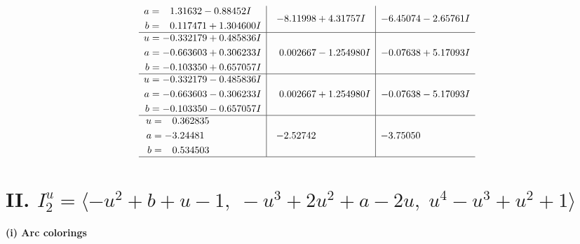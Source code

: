 \documentclass[1p]{elsarticle_modified}
\theoremstyle{definition}
\begin{document}
$$\begin{array}{c|c|c}
\begin{aligned}
a &= \phantom{-}1.31632 - 0.88452 I \\
b &= \phantom{-}0.117471 + 1.304600 I\end{aligned}
 & -8.11998 + 4.31757 I & -6.45074 - 2.65761 I \\ \hline\begin{aligned}
u &= -0.332179 + 0.485836 I \\
a &= -0.663603 + 0.306233 I \\
b &= -0.103350 + 0.657057 I\end{aligned}
 & \phantom{-}0.002667 - 1.254980 I & -0.07638 + 5.17093 I \\ \hline\begin{aligned}
u &= -0.332179 - 0.485836 I \\
a &= -0.663603 - 0.306233 I \\
b &= -0.103350 - 0.657057 I\end{aligned}
 & \phantom{-}0.002667 + 1.254980 I & -0.07638 - 5.17093 I \\ \hline\begin{aligned}
u &= \phantom{-}0.362835\phantom{ +0.000000I} \\
a &= -3.24481\phantom{ +0.000000I} \\
b &= \phantom{-}0.534503\phantom{ +0.000000I}\end{aligned}
 & -2.52742\phantom{ +0.000000I} & -3.75050\phantom{ +0.000000I}\\
 \hline 
 \end{array}$$\newpage\newpage\renewcommand{\arraystretch}{1}
\centering \section*{II. $I^u_{2}= \langle - u^2+b+u-1,\;- u^3+2 u^2+a-2 u,\;u^4- u^3+u^2+1 \rangle$}
\flushleft \textbf{(i) Arc colorings}\\
\end{document}

